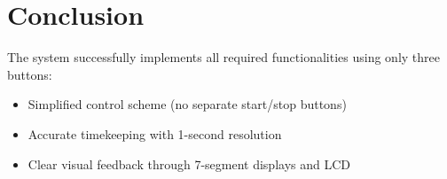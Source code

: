\documentclass{article}
\begin{document}
\section{Conclusion}
The system successfully implements all required functionalities using only three buttons:
\begin{itemize}
    \item Simplified control scheme (no separate start/stop buttons)
    \item Accurate timekeeping with 1-second resolution
    \item Clear visual feedback through 7-segment displays and LCD
\end{itemize}
\end{document}

